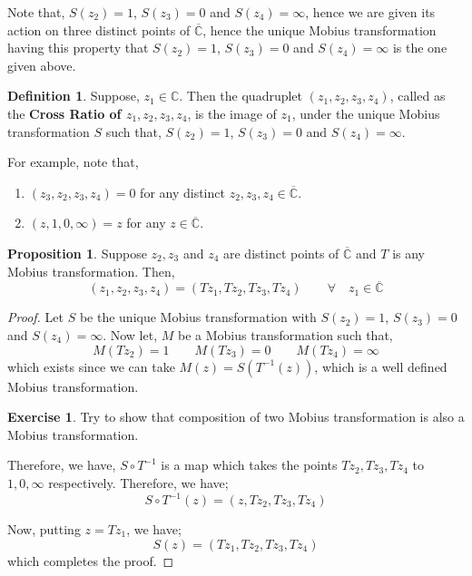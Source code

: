 \documentclass[12pt]{article}
\newcommand{\C}{\mathbb{C}}
\newcommand{\Cinf}{\overline{\C}}
\theoremstyle{definition}
\newtheorem{defn}{Definition}
\newtheorem{ex}{Exercise}
\newtheorem{prop}{Proposition}
\newenvironment{definition}{
\begin{tcolorbox}[colback=green!5!white,colframe=green!75!black, parbox = false]\begin{defn} }{\end{defn}\end{tcolorbox} }
\newenvironment{proposition}{
\begin{tcolorbox}[colback=green!5!white,colframe=green!75!black, parbox = false]\begin{prop} }{\end{prop}\end{tcolorbox} }
\newenvironment{example}{
\begin{tcolorbox}[colback=blue!5!white,colframe=blue!75!black, title = Example, parbox = false] }{\end{tcolorbox} }
\newenvironment{exercise}{
\begin{tcolorbox}[colback=red!5!white,colframe=red!75!black, parbox = false]\begin{ex} }{\end{ex}\end{tcolorbox} }
\begin{document}
Note that, $S(z_2) = 1$, $S(z_3) = 0$ and $S(z_4) = \infty$, hence we are given its action on three distinct points of $\Cinf$, hence the unique Mobius transformation having this property that $S(z_2) = 1$, $S(z_3) = 0$ and $S(z_4) = \infty$ is the one given above.

\begin{definition}
    Suppose, $z_1 \in \C$. Then the quadruplet $(z_1, z_2, z_3, z_4)$, called as the \textbf{Cross Ratio of $z_1, z_2, z_3, z_4$}, is the image of $z_1$, under the unique Mobius transformation $S$ such that, $S(z_2) = 1$, $S(z_3) = 0$ and $S(z_4) = \infty$.
\end{definition}

\begin{example}
    For example, note that,
    \begin{enumerate}
        \item $(z_3, z_2, z_3, z_4) = 0$ for any distinct $z_2, z_3, z_4 \in \Cinf$.
        \item $(z, 1, 0, \infty) = z$ for any $z \in \Cinf$. 
    \end{enumerate}
\end{example}

\begin{proposition}
    Suppose $z_2, z_3$ and $z_4$ are distinct points of $\Cinf$ and $T$ is any Mobius transformation. Then, 
    $$(z_1, z_2, z_3, z_4) = (Tz_1, Tz_2, Tz_3, Tz_4) \qquad \forall \quad z_1 \in \Cinf$$
\end{proposition}

\begin{proof}
    Let $S$ be the unique Mobius transformation with $S(z_2) = 1$, $S(z_3) = 0$ and $S(z_4) = \infty$.
    Now let, $M$ be a Mobius transformation such that,
    $$M(Tz_2) = 1\qquad M(Tz_3) = 0\qquad M(Tz_4) = \infty$$
    which exists since we can take $M(z) = S(T^{-1}(z))$, which is a well defined Mobius transformation.
    \begin{exercise}
        Try to show that composition of two Mobius transformation is also a Mobius transformation.
    \end{exercise}
    
    Therefore, we have, $S \circ T^{-1}$ is a map which takes the points $Tz_2, Tz_3, Tz_4$ to $1, 0, \infty$ respectively. Therefore, we have;
    $$S\circ T^{-1}(z) = (z, Tz_2, Tz_3, Tz_4)$$
    
    Now, putting $z = Tz_1$, we have;
    $$S(z) = (Tz_1, Tz_2, Tz_3, Tz_4)$$
    which completes the proof.
\end{proof}
\end{document}
